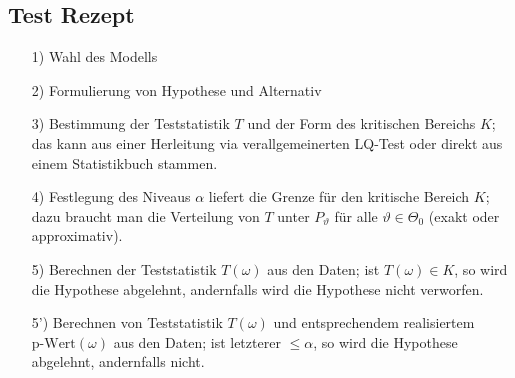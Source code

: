 \subsection{Test Rezept}
\begin{itemize}[leftmargin=0.35cm]
    \item[1)] Wahl des Modells
    \item[2)] Formulierung von Hypothese und Alternativ
    \item[3)] Bestimmung der Teststatistik $T$ und der Form des kritischen Bereichs $K$; das kann aus einer Herleitung via verallgemeinerten LQ-Test oder direkt aus einem Statistikbuch stammen.
    \item[4)] Festlegung des Niveaus $\alpha$ liefert die Grenze für den kritische Bereich $K$; dazu braucht man die Verteilung von $T$ unter $P_\vartheta$ für alle $\vartheta \in \Theta_0$ (exakt oder approximativ).
    \item[5)] Berechnen der Teststatistik $T(\omega)$ aus den Daten; ist $T(\omega) \in K$, so wird die Hypothese abgelehnt, andernfalls wird die Hypothese nicht verworfen.
    \item[5')] Berechnen von Teststatistik $T(\omega)$ und entsprechendem realisiertem $\text{p-Wert}(\omega)$ aus den Daten; ist letzterer $\le \alpha$, so wird die Hypothese abgelehnt, andernfalls nicht.
\end{itemize}
